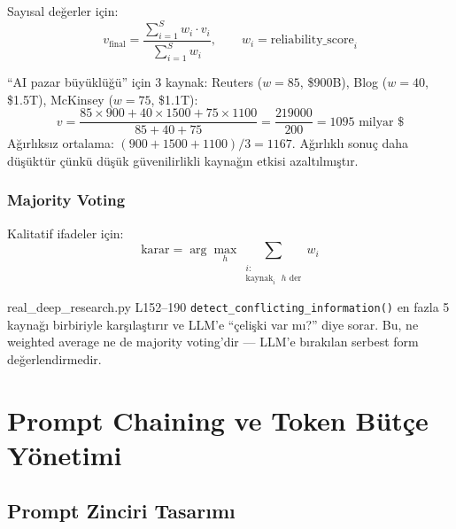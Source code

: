 Say{\i}sal de\u{g}erler i\c{c}in:
\begin{equation}
\label{eq:weighted_avg}
v_{\text{final}} = \frac{\sum_{i=1}^{S} w_i \cdot v_i}{\sum_{i=1}^{S} w_i}, \qquad w_i = \text{reliability\_score}_i
\end{equation}

\begin{ornek}
``AI pazar b\"{u}y\"{u}kl\"{u}\u{g}\"{u}'' i\c{c}in 3 kaynak: Reuters ($w=85$, \$900B), Blog ($w=40$, \$1.5T), McKinsey ($w=75$, \$1.1T):
\[
v = \frac{85 \times 900 + 40 \times 1500 + 75 \times 1100}{85 + 40 + 75} = \frac{219000}{200} = 1095 \text{ milyar \$}
\]
A\u{g}{\i}rl{\i}ks{\i}z ortalama: $(900+1500+1100)/3 = 1167$. A\u{g}{\i}rl{\i}kl{\i} sonu\c{c} daha d\"{u}\c{s}\"{u}kt\"{u}r \c{c}\"{u}nk\"{u} d\"{u}\c{s}\"{u}k g\"{u}venilirlikli kayna\u{g}{\i}n etkisi azalt{\i}lm{\i}\c{s}t{\i}r.
\end{ornek}

\subsubsection{Majority Voting}

Kalitatif ifadeler i\c{c}in:
\begin{equation}
\label{eq:majority_voting}
\text{karar} = \arg\max_{h} \sum_{\substack{i:\\ \text{kaynak}_i \text{ } h \text{ der}}} w_i
\end{equation}

\begin{kodref}{real\_deep\_research.py L152--190}
\texttt{detect\_conflicting\_information()} en fazla 5 kayna\u{g}{\i} birbiriyle kar\c{s}{\i}la\c{s}t{\i}r{\i}r ve LLM'e ``\c{c}eli\c{s}ki var m{\i}?'' diye sorar. Bu, ne weighted average ne de majority voting'dir --- LLM'e b{\i}rak{\i}lan serbest form de\u{g}erlendirmedir.
\end{kodref}


\section{Prompt Chaining ve Token B\"{u}t\c{c}e Y\"{o}netimi}
\label{sec:prompt_chaining}

\subsection{Prompt Zinciri Tasar{\i}m{\i}}

